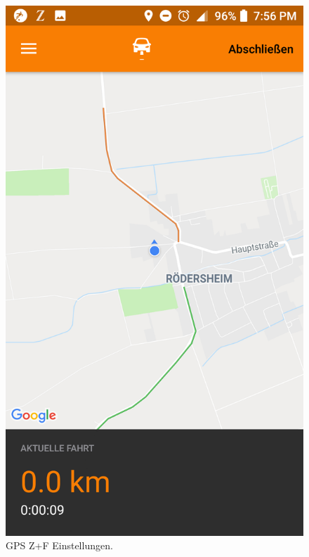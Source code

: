 \documentclass[a4paper]{article}
\begin{document}
\begin{figure}[H]%
    \begin{minipage}[b]{.4\linewidth} %
        \includegraphics[scale=0.14]{img/pro3}
        \caption{\label{img:img/pro3}GPS Z+F Einstellungen.}
    \end{minipage}
    \hspace{0.1\linewidth}%
    \begin{minipage}[b]{.4\linewidth} %

\end{minipage}
\end{figure}
\end{document}
